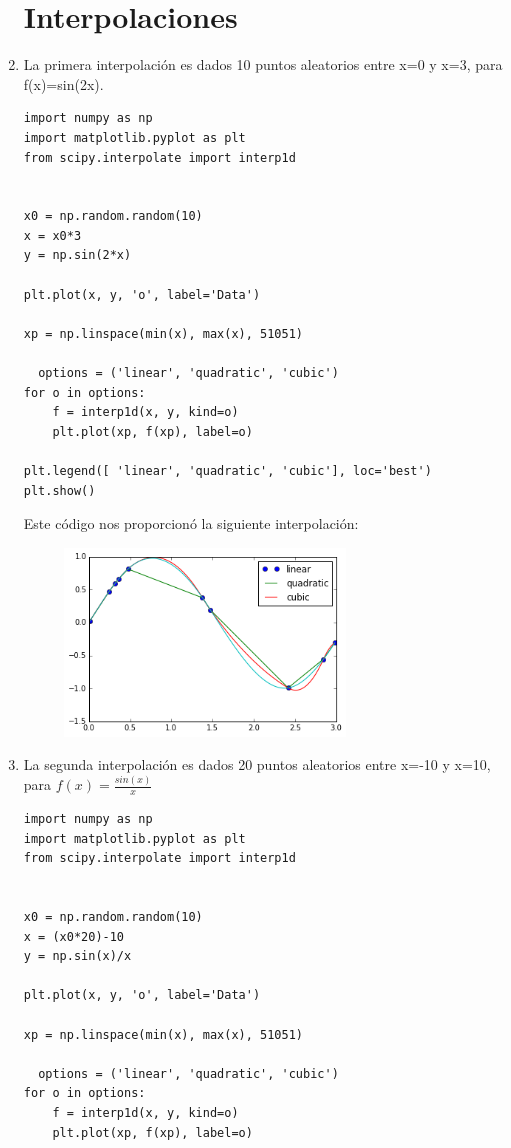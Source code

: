 \documentclass[12pt]{article}
\begin{document}
\begin{enumerate}


\section{Interpolaciones}
\item La primera interpolación es dados 10 puntos aleatorios entre x=0 y x=3, para f(x)=sin(2x).

\begin{verbatim}
import numpy as np
import matplotlib.pyplot as plt
from scipy.interpolate import interp1d


x0 = np.random.random(10)
x = x0*3
y = np.sin(2*x)

plt.plot(x, y, 'o', label='Data')

xp = np.linspace(min(x), max(x), 51051)
                
  options = ('linear', 'quadratic', 'cubic')
for o in options:
    f = interp1d(x, y, kind=o)    
    plt.plot(xp, f(xp), label=o)    
    
plt.legend([ 'linear', 'quadratic', 'cubic'], loc='best')
plt.show()
\end{verbatim}
 Este código nos proporcionó la siguiente interpolación:
 \begin{figure}[H]
\centering
\includegraphics[height=5cm]{sin.png}
\end{figure}


\item La segunda interpolación es dados 20 puntos aleatorios entre x=-10 y x=10, para $f(x)=\frac {sin(x)}{x}$
\begin{verbatim}
import numpy as np
import matplotlib.pyplot as plt
from scipy.interpolate import interp1d


x0 = np.random.random(10)
x = (x0*20)-10
y = np.sin(x)/x

plt.plot(x, y, 'o', label='Data')

xp = np.linspace(min(x), max(x), 51051)
                
  options = ('linear', 'quadratic', 'cubic')
for o in options:
    f = interp1d(x, y, kind=o)    
    plt.plot(xp, f(xp), label=o)    
    

\end{verbatim}
\end{enumerate}
\end{document}
